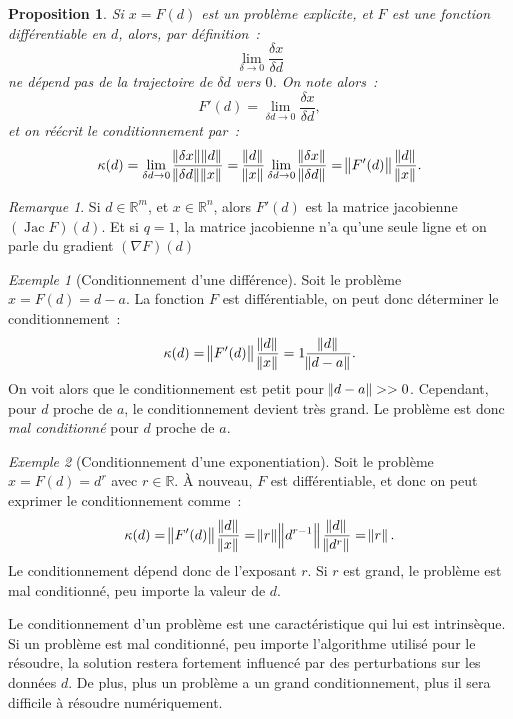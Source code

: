 \documentclass{article}
\newtheorem{prp}[thm]{Proposition}
\theoremstyle{definition}
\theoremstyle{remark}
\newtheorem*{rmq}{Remarque}
\newtheorem{ex}{Exemple}
\DeclareMathOperator{\Jac}{Jac}
\newcommand{\R}{\mathbb R}
\begin{document}
	\begin{prp} Si $x = F(d)$ est un problème explicite, et $F$ est une fonction différentiable en $d$, alors, par définition~:
	\[\lim_{\delta \to 0}\frac {\delta x}{\delta d}\]
	ne dépend pas de la trajectoire de $\delta d$ vers $0$. On note alors~:
	\[F'(d) = \lim_{\delta d \to 0}\frac {\delta x}{\delta d},\]
	et on réécrit le conditionnement par~:
	\[\kappa(d) = \lim_{\delta d \to 0}\frac {\norm {\delta x}\norm d}{\norm {\delta d}\norm x}
	= \frac {\norm d}{\norm x}\lim_{\delta d \to 0}\frac {\norm {\delta x}}{\norm {\delta d}} = \norm {F'(d)}\frac {\norm  d}{\norm x}.\]
	\end{prp}

	\begin{rmq} Si $d \in \R^m$, et $x \in \R^n$, alors $F'(d)$ est la matrice jacobienne $(\Jac F)(d)$. Et si $q = 1$, la matrice jacobienne n'a qu'une seule
	ligne et on parle du gradient $(\nabla F)(d)$
	\end{rmq}

	\begin{ex}[Conditionnement d'une différence] Soit le problème $x = F(d) = d-a$. La fonction $F$ est différentiable, on peut donc déterminer le
	conditionnement~:
	\[\kappa(d) = \norm {F'(d)}\frac {\norm d}{\norm x} = 1\frac {\norm d}{\norm {d-a}}.\]
	On voit alors que le conditionnement est petit pour $\norm {d-a} >> 0$. Cependant, pour $d$ proche de $a$, le conditionnement devient très grand.
	Le problème est donc \emph{mal conditionné} pour $d$ proche de $a$.
	\end{ex}

	\begin{ex}[Conditionnement d'une exponentiation] Soit le problème $x = F(d) = d^r$ avec $r \in \R$. À nouveau, $F$ est différentiable, et donc on peut
	exprimer le conditionnement comme~:
	\[\kappa(d) = \norm {F'(d)}\frac {\norm d}{\norm x} = \norm r\norm {d^{r-1}}\frac {\norm d}{\norm {d^r}} = \norm r.\]
	Le conditionnement dépend donc de l'exposant $r$. Si $r$ est grand, le problème est mal conditionné, peu importe la valeur de $d$.
	\end{ex}

	Le conditionnement d'un problème est une caractéristique qui lui est intrinsèque. Si un problème est mal conditionné, peu importe l'algorithme utilisé pour
	le résoudre, la solution restera fortement influencé par des perturbations sur les données $d$. De plus, plus un problème a un grand conditionnement, plus
	il sera difficile à résoudre numériquement.
\end{document}
